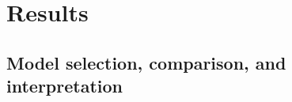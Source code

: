 
\chapter{Results} %

\label{Chapter 3} %





\section{Model selection, comparison, and interpretation}

%



